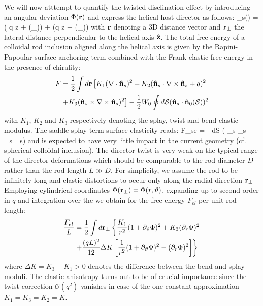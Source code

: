 We will now atttempt to quantify the twisted disclination effect by introducing an angular deviation $\Phi({\bf r})$ and express the helical host director as follows:
\beq
\bn_{s}(\bfr) = \bx \cos( q z + \Phi(\bfr_{\perp}))  + \by \sin (q z + \Phi(\bfr_{\perp}))
\label{nsebluee}
\eeq
with ${\bf r}$ denoting a 3D distance vector and ${\bf r}_{\perp}$  the lateral distance perpendicular to the helical axis ${\bf \hat{z}}$.  The total free energy of a colloidal rod inclusion aligned along the helical axis is given by the Rapini-Papoular surface anchoring term  combined with the Frank elastic free energy in the presence of chirality:
\begin{align}
F &= \frac{1}{2} \int d {\bf r} \left [ K_{1} (\nabla \cdot {\bf \hat{n}}_{s})^{2}  + K_{2} ({\bf \hat{n}}_{s} \cdot \nabla \times {\bf \hat{n}}_{s} + q)^{2} \right . \nonumber \\
& \left . +   K_{3} ({\bf \hat{n}}_{s} \times \nabla \times {\bf \hat{n}}_{s})^{2} \right ]
-\frac{1}{2} W_{0} \oint d{\mathcal S}  ({\bf \hat{n}}_{s} \cdot {\bf \hat{n}}_{0}({\mathcal S}))^{2}
\end{align}
with $K_{1}$, $K_{2}$ and $K_{3}$ respectively denoting the splay, twist and bend elastic modulus.  The saddle-splay term surface elasticity reads:
\beq
F_{se} = - \oint d{\mathcal S} \cdot \left ( \bn_{s} \nabla \cdot \bn_{s} +  \bn_{s} \times \nabla \times \bn_{s}\right )
\eeq
and is expected to have very little impact in the current geometry (cf. spherical colloidal inclusion).
The director twist is very weak on the typical range of the director deformations which should be comparable to the rod diameter $D$ rather than the rod length $L \gg D$. For simplicity, we assume the rod to be infinitely long and elastic distortions to occur only along the radial direction ${\bf r}_{\perp}$ Employing cylindrical coordinates $\Phi({\bf r}_{\perp}) = \Phi (r, \vartheta ) $, expanding up to second order in $q$ and integration over the  we obtain for the  free energy  $ F_{el}$ per unit rod length:
\begin{align}
 \frac{F_{el}}{L} &=  \frac{1}{2} \int d  {\bf r}_{\perp} \left \{ \frac{K_{1}}{r^{2}} (1+ \partial_{\vartheta} \Phi)^{2} + K_{3} (\partial_{r} \Phi)^{2} \right . \nonumber \\
  & \left . + \frac{(qL)^{2}}{12} \Delta K  \left  [ \frac{1}{r^{2}} (1+ \partial_{\vartheta} \Phi)^{2} - (\partial_{r} \Phi)^{2} \right ] \right \}
  \label{felo}
  \end{align}
  where $\Delta K = K_{3} - K_{1} >0 $ denotes the difference between the bend and splay moduli. The elastic anisotropy turns out to be of crucial importance since the twist correction $\mathcal{O}(q^{2})$  vanishes in case of the one-constant approximation $K_{1} = K_{3} = K_{2} = K$.
